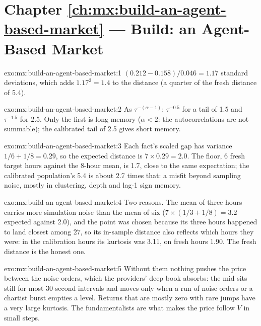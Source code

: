 \section*{Chapter \ref{ch:mx:build-an-agent-based-market} --- Build: an Agent-Based Market}

\begin{solution}{exo:mx:build-an-agent-based-market:1}
$(0.212-0.158)/0.046=1.17$ standard deviations, which adds $1.17^2=1.4$ to the distance (a quarter of the fresh distance of 5.4).
\end{solution}

\begin{solution}{exo:mx:build-an-agent-based-market:2}
As $\tau^{-(\alpha-1)}$: $\tau^{-0.5}$ for a tail of 1.5 and $\tau^{-1.5}$ for 2.5. Only the first is long memory ($\alpha<2$: the autocorrelations
are not summable); the calibrated tail of 2.5 gives short memory.
\end{solution}

\begin{solution}{exo:mx:build-an-agent-based-market:3}
Each fact's scaled gap has variance $1/6+1/8=0.29$, so the expected distance is $7\times0.29=2.0$. The floor, 6 fresh target hours against the
8-hour mean, is 1.7, close to the same expectation; the calibrated population's 5.4 is about 2.7 times that:
a misfit beyond sampling noise, mostly in clustering, depth and lag-1 sign memory.
\end{solution}

\begin{solution}{exo:mx:build-an-agent-based-market:4}
Two reasons. The mean of three hours carries more simulation noise than the mean of six ($7\times(1/3+1/8)=3.2$ expected against 2.0), and the point was
chosen because its three hours happened to land closest among 27, so its in-sample distance also reflects which hours they were: in the calibration
hours its kurtosis was 3.11, on fresh hours 1.90. The fresh distance is the honest one.
\end{solution}

\begin{solution}{exo:mx:build-an-agent-based-market:5}
Without them nothing pushes the price between the noise orders, which the providers' deep book absorbs: the mid sits still for most 30-second
intervals and moves only when a run of noise orders or a chartist burst empties a level. Returns that are mostly zero with rare jumps have a very large
kurtosis. The fundamentalists are what makes the price follow $V$ in small steps.
\end{solution}

